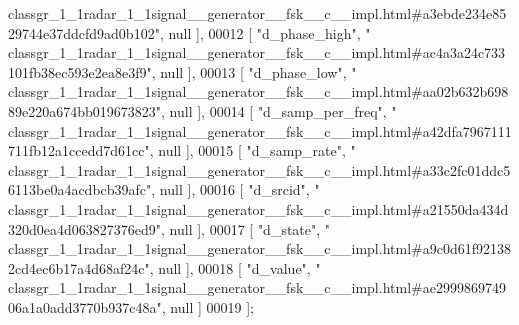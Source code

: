 \begin{DoxyCode}
{      classgr\_1\_1radar\_1\_1signal\_\_generator\_\_fsk\_\_c\_\_impl.html#a3ebde234e8529744e37ddcfd9ad0b102"}, null ],
00012     [ \textcolor{stringliteral}{"d\_phase\_high"}, \textcolor{stringliteral}{"
      classgr\_1\_1radar\_1\_1signal\_\_generator\_\_fsk\_\_c\_\_impl.html#ac4a3a24c733101fb38ec593e2ea8e3f9"}, null ],
00013     [ \textcolor{stringliteral}{"d\_phase\_low"}, \textcolor{stringliteral}{"
      classgr\_1\_1radar\_1\_1signal\_\_generator\_\_fsk\_\_c\_\_impl.html#aa02b632b69889e220a674bb019673823"}, null ],
00014     [ \textcolor{stringliteral}{"d\_samp\_per\_freq"}, \textcolor{stringliteral}{"
      classgr\_1\_1radar\_1\_1signal\_\_generator\_\_fsk\_\_c\_\_impl.html#a42dfa7967111711fb12a1ccedd7d61cc"}, null ],
00015     [ \textcolor{stringliteral}{"d\_samp\_rate"}, \textcolor{stringliteral}{"
      classgr\_1\_1radar\_1\_1signal\_\_generator\_\_fsk\_\_c\_\_impl.html#a33c2fc01ddc56113be0a4acdbcb39afc"}, null ],
00016     [ \textcolor{stringliteral}{"d\_srcid"}, \textcolor{stringliteral}{"
      classgr\_1\_1radar\_1\_1signal\_\_generator\_\_fsk\_\_c\_\_impl.html#a21550da434d320d0ea4d063827376ed9"}, null ],
00017     [ \textcolor{stringliteral}{"d\_state"}, \textcolor{stringliteral}{"
      classgr\_1\_1radar\_1\_1signal\_\_generator\_\_fsk\_\_c\_\_impl.html#a9c0d61f921382cd4ec6b17a4d68af24c"}, null ],
00018     [ \textcolor{stringliteral}{"d\_value"}, \textcolor{stringliteral}{"
      classgr\_1\_1radar\_1\_1signal\_\_generator\_\_fsk\_\_c\_\_impl.html#ae299986974906a1a0add3770b937c48a"}, null ]
00019 ];
\end{DoxyCode}
